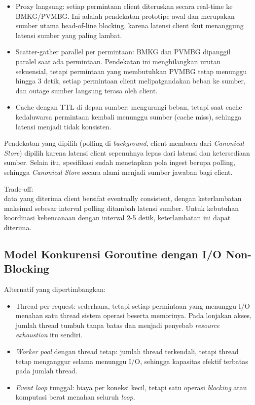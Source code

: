 \begin{itemize}
\tightlist
\item
  Proxy langsung: setiap permintaan client diteruskan secara real-time ke BMKG/PVMBG. Ini adalah pendekatan prototipe awal dan merupakan sumber utama head-of-line blocking, karena latensi client ikut menanggung latensi sumber yang paling lambat.\\
\item
  Scatter-gather parallel per permintaan: BMKG dan PVMBG dipanggil paralel saat ada permintaan. Pendekatan ini menghilangkan urutan sekuensial, tetapi permintaan yang membutuhkan PVMBG tetap menunggu hingga 3 detik, setiap permintaan client melipatgandakan beban ke sumber, dan outage sumber langsung terasa oleh client.\\
\item
  Cache dengan TTL di depan sumber: mengurangi beban, tetapi saat cache kedaluwarsa permintaan kembali menunggu sumber (cache miss), sehingga latensi menjadi tidak konsisten.
\end{itemize}

Pendekatan yang dipilih (polling di \emph{background}, client membaca dari \emph{Canonical Store}) dipilih karena latensi client sepenuhnya lepas dari latensi dan ketersediaan sumber. Selain itu, spesifikasi sudah menetapkan pola ingest berupa polling, sehingga \emph{Canonical Store} secara alami menjadi sumber jawaban bagi client.

Trade-off:\\
data yang diterima client bersifat eventually consistent, dengan keterlambatan maksimal sebesar interval polling ditambah latensi sumber. Untuk kebutuhan koordinasi kebencanaan dengan interval 2-5 detik, keterlambatan ini dapat diterima.

\subsection{Model Konkurensi Goroutine dengan I/O Non-Blocking}

Alternatif yang dipertimbangkan:

\begin{itemize}
\tightlist
\item
  Thread-per-request: sederhana, tetapi setiap permintaan yang menunggu I/O menahan satu thread sistem operasi beserta memorinya. Pada lonjakan akses, jumlah thread tumbuh tanpa batas dan menjadi penyebab \emph{resource exhaustion} itu sendiri.\\
\item
  \emph{Worker pool} dengan thread tetap: jumlah thread terkendali, tetapi thread tetap menganggur selama menunggu I/O, sehingga kapasitas efektif terbatas pada jumlah thread.\\
\item
  \emph{Event loop} tunggal: biaya per koneksi kecil, tetapi satu operasi \emph{blocking} atau komputasi berat menahan seluruh \emph{loop}.
\end{itemize}

